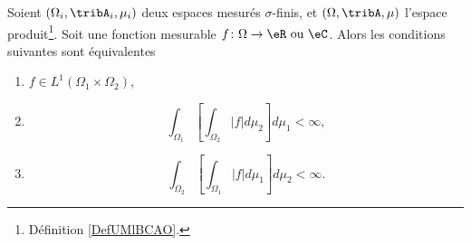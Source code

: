 \begin{corollary}           \label{CorTKZKwP}
    Soient \( (\Omega_i,\tribA_i,\mu_i)\) deux espaces mesurés \( \sigma\)-finis, et \( (\Omega,\tribA,\mu)\) l'espace produit\footnote{Définition \ref{DefUMlBCAO}.}. Soit une fonction mesurable \( f\colon \Omega\to \eR\text{ ou }\eC\). Alors les conditions suivantes sont équivalentes
    \begin{enumerate}
        \item   \label{ITEMooZRAXooTRDIlZ}
            \( f\in L^1(\Omega_1\times \Omega_2)\),
        \item       \label{ITEMooJMPLooZKwxQC}
            \begin{equation}
                \int_{\Omega_1}\left[ \int_{\Omega_2}| f |d\mu_2 \right]d\mu_1 <\infty,
            \end{equation}
        \item   \label{ITEMooLLBCooTRycwG}
            \begin{equation}
                \int_{\Omega_2}\left[ \int_{\Omega_1}| f |d\mu_1 \right]d\mu_2 <\infty.
            \end{equation}
    \end{enumerate}
\end{corollary}

